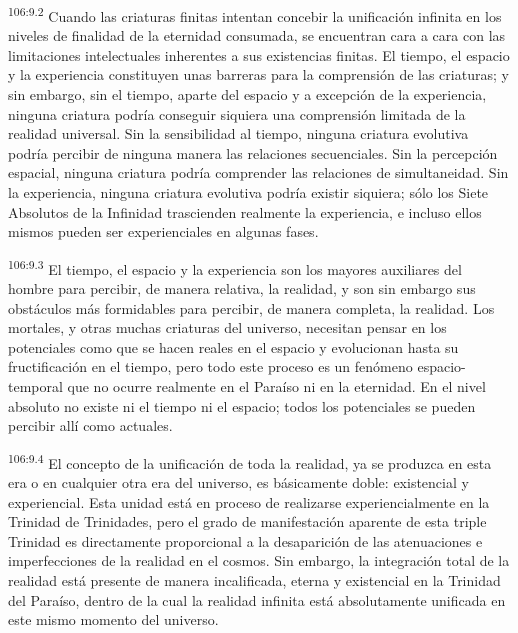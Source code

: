 \par
\textsuperscript{106:9.2} Cuando las criaturas finitas intentan concebir la unificación infinita en los niveles de finalidad de la eternidad consumada, se encuentran cara a cara con las limitaciones intelectuales inherentes a sus existencias finitas. El tiempo, el espacio y la experiencia constituyen unas barreras para la comprensión de las criaturas; y sin embargo, sin el tiempo, aparte del espacio y a excepción de la experiencia, ninguna criatura podría conseguir siquiera una comprensión limitada de la realidad universal. Sin la sensibilidad al tiempo, ninguna criatura evolutiva podría percibir de ninguna manera las relaciones secuenciales. Sin la percepción espacial, ninguna criatura podría comprender las relaciones de simultaneidad. Sin la experiencia, ninguna criatura evolutiva podría existir siquiera; sólo los Siete Absolutos de la Infinidad trascienden realmente la experiencia, e incluso ellos mismos pueden ser experienciales en algunas fases.

\par
\textsuperscript{106:9.3} El tiempo, el espacio y la experiencia son los mayores auxiliares del hombre para percibir, de manera relativa, la realidad, y son sin embargo sus obstáculos más formidables para percibir, de manera completa, la realidad. Los mortales, y otras muchas criaturas del universo, necesitan pensar en los potenciales como que se hacen reales en el espacio y evolucionan hasta su fructificación en el tiempo, pero todo este proceso es un fenómeno espacio-temporal que no ocurre realmente en el Paraíso ni en la eternidad. En el nivel absoluto no existe ni el tiempo ni el espacio; todos los potenciales se pueden percibir allí como actuales.

\par
\textsuperscript{106:9.4} El concepto de la unificación de toda la realidad, ya se produzca en esta era o en cualquier otra era del universo, es básicamente doble: existencial y experiencial. Esta unidad está en proceso de realizarse experiencialmente en la Trinidad de Trinidades, pero el grado de manifestación aparente de esta triple Trinidad es directamente proporcional a la desaparición de las atenuaciones e imperfecciones de la realidad en el cosmos. Sin embargo, la integración total de la realidad está presente de manera incalificada, eterna y existencial en la Trinidad del Paraíso, dentro de la cual la realidad infinita está absolutamente unificada en este mismo momento del universo.

